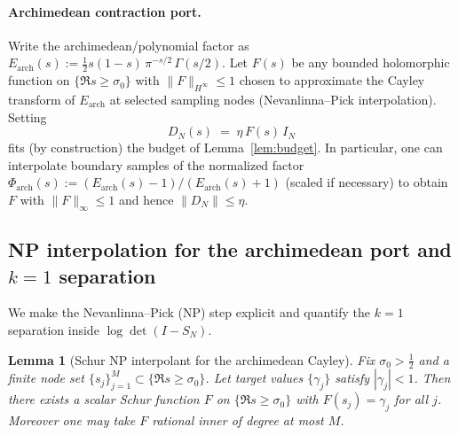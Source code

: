 \documentclass[11pt]{article}
\newtheorem{lemma}[theorem]{Lemma}
\theoremstyle{definition}
\theoremstyle{remark}
\begin{document}
\paragraph{Archimedean contraction port.}
Write the archimedean/polynomial factor as $E_{\mathrm{arch}}(s):=\tfrac12 s(1-s)\,\pi^{-s/2}\,\Gamma(s/2)$. Let $F(s)$ be any bounded holomorphic function on $\{\Re s\ge \sigma_0\}$ with $\|F\|_{H^\infty}\le 1$ chosen to approximate the Cayley transform of $E_{\mathrm{arch}}$ at selected sampling nodes (Nevanlinna--Pick interpolation). Setting
\[
 D_N(s)\;=\;\eta\,F(s)\,I_N
\]
fits (by construction) the budget of Lemma~\ref{lem:budget}. In particular, one can interpolate boundary samples of the normalized factor $\Phi_{\mathrm{arch}}(s):=(E_{\mathrm{arch}}(s)-1)/(E_{\mathrm{arch}}(s)+1)$ (scaled if necessary) to obtain $F$ with $\|F\|_\infty\le 1$ and hence $\|D_N\|\le \eta$.

\subsection{NP interpolation for the archimedean port and $k=1$ separation}\label{subsec:NP-arch}
We make the Nevanlinna--Pick (NP) step explicit and quantify the $k=1$ separation inside $\log\det(I-S_N)$.

\begin{lemma}[Schur NP interpolant for the archimedean Cayley]
Fix $\sigma_0>\tfrac12$ and a finite node set $\{s_j\}_{j=1}^{M}\subset\{\Re s\ge \sigma_0\}$. Let target values $\{\gamma_j\}$ satisfy $|\gamma_j|<1$. Then there exists a scalar Schur function $F$ on $\{\Re s\ge \sigma_0\}$ with $F(s_j)=\gamma_j$ for all $j$. Moreover one may take $F$ rational inner of degree at most $M$.
\end{lemma}
\end{document}
